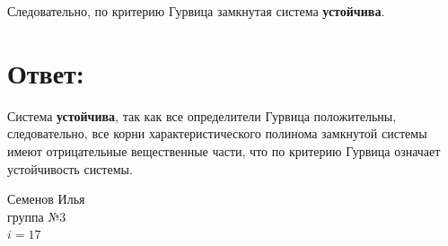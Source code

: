 Следовательно, по критерию Гурвица замкнутая система \textbf{устойчива}.

\section*{Ответ:}

Система \textbf{устойчива}, так как все определители Гурвица положительны, следовательно, все корни характеристического полинома замкнутой системы имеют отрицательные вещественные части, что по критерию Гурвица означает устойчивость системы.

\vfill

\begin{flushright}
Семенов Илья \\
группа №3 \\
$i = 17$
\end{flushright}